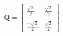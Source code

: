 \documentclass[preview]{standalone}
\begin{document}
\begin{align*}
\mathbf{Q} = \begin{bmatrix}\frac{\sqrt{2}}{2} & \frac{\sqrt{2}}{2} \\ \\\frac{-\sqrt{2}}{2} & \frac{\sqrt{2}}{2}\end{bmatrix}
\end{align*}
\end{document}
